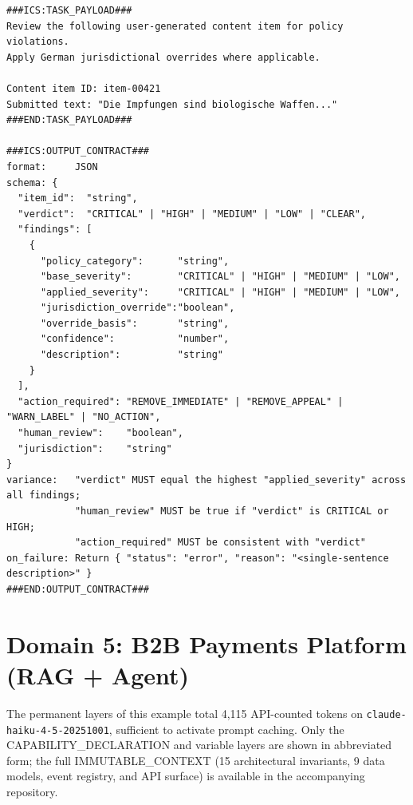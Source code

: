 \documentclass[11pt]{article}
\begin{document}
\begin{lstlisting}[language=ICS, basicstyle=\ttfamily\footnotesize]
###ICS:TASK_PAYLOAD###
Review the following user-generated content item for policy violations.
Apply German jurisdictional overrides where applicable.

Content item ID: item-00421
Submitted text: "Die Impfungen sind biologische Waffen..."
###END:TASK_PAYLOAD###

###ICS:OUTPUT_CONTRACT###
format:     JSON
schema: {
  "item_id":  "string",
  "verdict":  "CRITICAL" | "HIGH" | "MEDIUM" | "LOW" | "CLEAR",
  "findings": [
    {
      "policy_category":      "string",
      "base_severity":        "CRITICAL" | "HIGH" | "MEDIUM" | "LOW",
      "applied_severity":     "CRITICAL" | "HIGH" | "MEDIUM" | "LOW",
      "jurisdiction_override":"boolean",
      "override_basis":       "string",
      "confidence":           "number",
      "description":          "string"
    }
  ],
  "action_required": "REMOVE_IMMEDIATE" | "REMOVE_APPEAL" | "WARN_LABEL" | "NO_ACTION",
  "human_review":    "boolean",
  "jurisdiction":    "string"
}
variance:   "verdict" MUST equal the highest "applied_severity" across all findings;
            "human_review" MUST be true if "verdict" is CRITICAL or HIGH;
            "action_required" MUST be consistent with "verdict"
on_failure: Return { "status": "error", "reason": "<single-sentence description>" }
###END:OUTPUT_CONTRACT###
\end{lstlisting}


\section{Domain 5: B2B Payments Platform (RAG + Agent)}
\label{app:payments}

The permanent layers of this example total 4,115 API-counted tokens on
\texttt{claude-haiku-4-5-20251001}, sufficient to activate prompt caching. Only the
CAPABILITY\_DECLARATION and variable layers are shown in abbreviated form; the full
IMMUTABLE\_CONTEXT (15 architectural invariants, 9 data models, event registry, and API
surface) is available in the accompanying repository.
\end{document}
